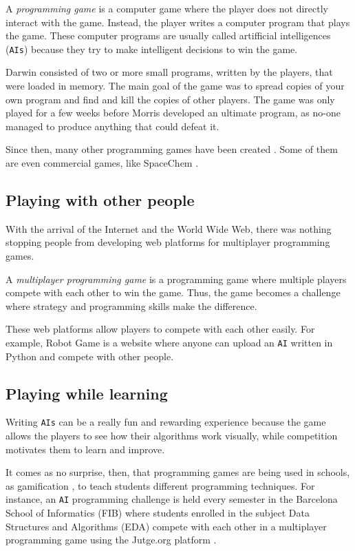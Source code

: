 \documentclass[a4paper,11pt,titlepage,abstract,numbers=noenddot,automark,mnsy,intlimits,rgb,dvipsnames]{report}
\begin{document}
A \emph{programming game} is a computer game where the player does not directly interact with the game. Instead, the
player writes a computer program that plays the game. These computer programs are usually called artifficial
intelligences (\texttt{AIs}) because they try to make intelligent decisions to win the game.

Darwin consisted of two or more small programs, written by the players, that were loaded in memory. The main goal
of the game was to spread copies of your own program and find and kill the copies of other players. The game was only
played for a few weeks before Morris developed an ultimate program, as no-one managed to produce anything that could
defeat it.

Since then, many other programming games have been created \cite{pg}. Some of them are even commercial games, like
SpaceChem \cite{spacechem}.
\subsection{Playing with other people}
With the arrival of the Internet and the World Wide Web, there was nothing stopping people from
developing web platforms for multiplayer programming games.

A \emph{multiplayer programming game} is a programming game where multiple players compete with each other to win the
game. Thus, the game becomes a challenge where strategy and programming skills make the difference.

These web platforms allow players to compete with each other easily. For example, Robot Game
\cite{robotgame} is a website where anyone can upload an \texttt{AI} written in \texttt{}Python\texttt{} and compete with other people.
\subsection{Playing while learning}
Writing \texttt{AIs} can be a really fun and rewarding experience because the game allows the players to see how their
algorithms work visually, while competition motivates them to learn and improve.

It comes as no surprise, then, that programming games are being used in schools, as gamification \cite{gamification},
to teach students different programming techniques.
For instance, an \texttt{AI} programming challenge is held every semester in the Barcelona School of
Informatics (FIB) where students enrolled in the subject Data Structures and Algorithms (EDA) \cite{eda}
compete with each other in a multiplayer programming game using the Jutge.org platform \cite{jutge}.
\end{document}
